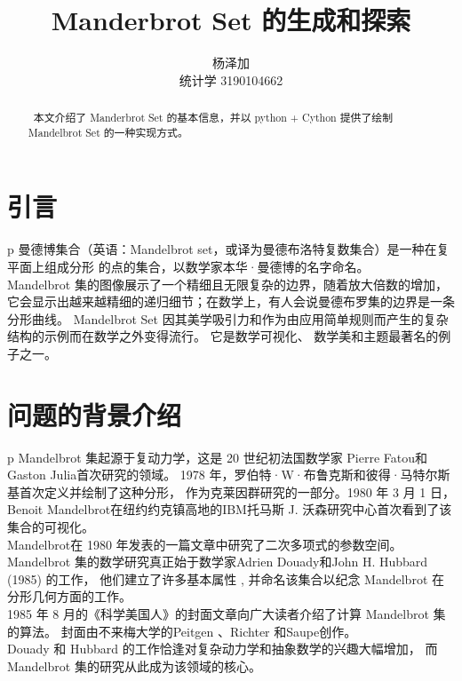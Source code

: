 \documentclass{ctexart}
\title{Manderbrot Set 的生成和探索}
\author{杨泽加 \\ 统计学 3190104662}
\begin{document}
    

    \maketitle

    \begin{abstract}\
        {\kaishu 本文介绍了 Manderbrot Set 的基本信息，并以 python + Cython 提供了绘制
        Mandelbrot Set 的一种实现方式。}
    \end{abstract}
    \section{引言}\label{S1}
    \begin{tabular}{p\columnwidth}
        曼德博集合（英语：Mandelbrot set，或译为曼德布洛特复数集合）是一种在复平面上组成分形
        的点的集合，以数学家本华·曼德博的名字命名。\cite{mandelbrotWiki}\\
        Mandelbrot 集的图像展示了一个精细且无限复杂的边界，随着放大倍数的增加，
        它会显示出越来越精细的递归细节；在数学上，有人会说曼德布罗集的边界是一条分形曲线。
        Mandelbrot Set 因其美学吸引力和作为由应用简单规则而产生的复杂结构的示例而在数学之外变得流行。
        它是数学可视化、 数学美和主题最著名的例子之一。\\
    \end{tabular}
    \section{问题的背景介绍}\label{S2}
    \begin{tabular}{p\columnwidth}
        Mandelbrot 集起源于复动力学，这是 20 世纪初法国数学家 Pierre Fatou和Gaston Julia首次研究的领域。
        1978 年，罗伯特·W·布鲁克斯和彼得·马特尔斯基首次定义并绘制了这种分形，
        作为克莱因群研究的一部分。\cite{IRwinKraRB&JPM}1980 年 3 月 1 日，
        Benoit Mandelbrot在纽约约克镇高地的IBM托马斯 J. 沃森研究中心首次看到了该集合的可视化。\\
        Mandelbrot在 1980 年发表的一篇文章中研究了二次多项式的参数空间。\cite{MandelbrotScience}
        Mandelbrot 集的数学研究真正始于数学家Adrien Douady和John H. Hubbard (1985) \cite{EtudeAD&JHH}
        的工作， 他们建立了许多基本属性 , 并命名该集合以纪念 Mandelbrot 在分形几何方面的工作。\\
        1985 年 8 月的《科学美国人》的封面文章向广大读者介绍了计算 Mandelbrot 集的算法。
        封面由不来梅大学的Peitgen 、Richter 和Saupe创作。\cite{AmericanScience4A1985}\\
        Douady 和 Hubbard 的工作恰逢对复杂动力学和抽象数学的兴趣大幅增加，
        而 Mandelbrot 集的研究从此成为该领域的核心。
    \end{tabular}
\end{document}

